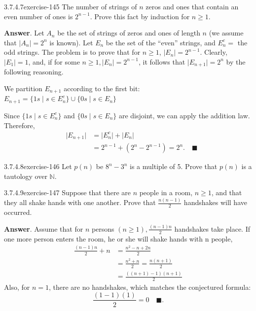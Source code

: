 \documentclass[twoside,10pt,]{book}
\numberwithin{equation}{section}
\begin{document}
\begin{divisionsolution}{3.7.4.7}{}{exercise-145}%
\hypertarget{p-1358}{}%
The number of strings of \(n\) zeros and ones that contain an even number of ones is \(2^{n-1}\).   Prove this fact by induction for \(n \geq  1\).%
\par\smallskip%
\noindent\textbf{Answer}.\quad%
\hypertarget{p-1359}{}%
Let \(A_n\) be the set of strings of zeros and ones of length \(n\) (we assume that \(\lvert A_n \rvert =2^n\) is known). Let  \(E_n\) be the set of the ``even'' strings, and \(E_{n}^{c}=\) the odd strings. The problem is to prove that for \(n\geqslant 1\), \(\lvert E_n \rvert =2^{n-1}\). Clearly, \(\lvert E_1\rvert =1\), and, if for some \(n\geqslant 1, \lvert E_n\rvert =2^{n-1}\), it follows that \(\lvert E_{n+1}\rvert  =2^n\) by the following reasoning.%
\par
\hypertarget{p-1360}{}%
We partition \(E_{n+1}\) according to the first bit: \(E_{n+1}=\{1s\mid s \in E_n^c \}\cup \{ 0s \mid s \in E_n\}\)%
\par
\hypertarget{p-1361}{}%
Since \(\{1s\mid s \in E_n^c\}\) and \(\{0s \mid s \in E_n\}\) are disjoint, we can apply the addition law. Therefore,%
\begin{equation*}
\begin{split}
\quad \lvert  E_{n+1}\rvert & =\lvert E_n^c \rvert  +\lvert  E_n \rvert  \\
& =2^{n-1}+ (2^n-2^{n-1}) =2^n.\quad \blacksquare
\end{split}
\end{equation*}
%
\end{divisionsolution}%
\begin{divisionsolution}{3.7.4.8}{}{exercise-146}%
\hypertarget{p-1362}{}%
Let \(p(n)\) be \(8^n-3^n\) is a multiple of 5.  Prove that \(p(n)\) is a tautology over \(\mathbb{N}\).%
\end{divisionsolution}%
\begin{divisionsolution}{3.7.4.9}{}{exercise-147}%
\hypertarget{p-1363}{}%
Suppose that there are \(n\) people in a room, \(n \geq  1\), and that they all shake hands with one another. Prove that \(\frac{n(n-1)}{2}\) handshakes will have occurred.%
\par\smallskip%
\noindent\textbf{Answer}.\quad%
\hypertarget{p-1364}{}%
Assume that for \(n\) persons \((n\geqslant 1),\frac{(n-1)n}{2}\) handshakes take place. If one more person enters the room, he or she will shake hands with n people,%
\begin{equation*}
\begin{split}
\frac{(n-1)n}{2}+n & =\frac{n^2-n+2n}{2}\\
&=\frac{n^2+n}{2}=\frac{n(n+1)}{2}\\
&=\frac{((n+1)-1)(n+1)}{2}
\end{split}
\end{equation*}
Also, for \(n=1\), there are no handshakes, which matches the conjectured formula:%
\begin{equation*}
\frac{(1-1)(1)}{2}=0 \quad \blacksquare.
\end{equation*}
%
\end{divisionsolution}%
\end{document}
